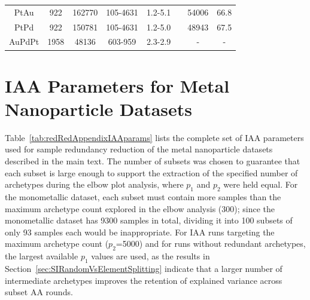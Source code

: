 \documentclass[12pt]{article}
\begin{document}
\begin{table}[htbp!]
\begin{tabular}{c|ccccc|cc}
            PtAu    &      922 &    162770 &  105-4631 &  1.2-5.1 &  \cite{Ting2023PtAuData} &       54006 &     66.8 \\
            PtPd    &      922 &    150781 &  105-4631 &  1.2-5.0 &  \cite{Ting2023PtPdData} &       48943 &     67.5 \\
            AuPdPt  &     1958 &     48136 &   603-959 &  2.3-2.9 &  \cite{Lu2023AuPdPtData} &           - &        - \\
            \hline
    \end{tabular}
    \label{tab:rawDatasets}
\end{table}

\section{IAA Parameters for Metal Nanoparticle Datasets}
\label{sec:SIIAAparams}

Table~\ref{tab:redRedAppendixIAAparams} lists the complete set of IAA parameters used for sample redundancy reduction of the metal nanoparticle datasets described in the main text. The number of subsets was chosen to guarantee that each subset is large enough to support the extraction of the specified number of archetypes during the elbow plot analysis, where $p_1$ and $p_2$ were held equal. For the monometallic dataset, each subset must contain more samples than the maximum archetype count explored in the elbow analysis (300); since the monometallic dataset has 9300 samples in total, dividing it into 100 subsets of only 93 samples each would be inappropriate. For IAA runs targeting the maximum archetype count ($p_2$=5000) and for runs without redundant archetypes, the largest available $p_1$ values are used, as the results in Section~\ref{sec:SIRandomVsElementSplitting} indicate that a larger number of intermediate archetypes improves the retention of explained variance across subset AA rounds.
\end{document}
